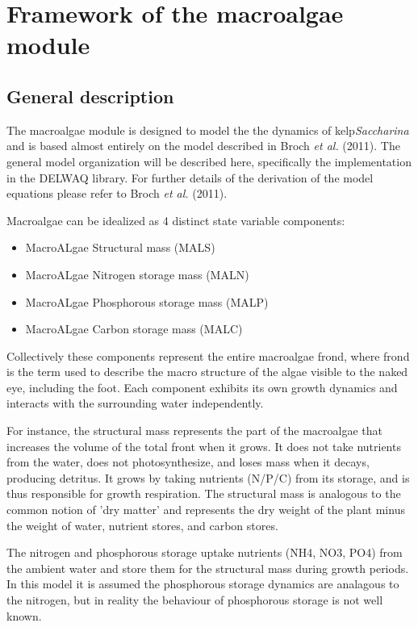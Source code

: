\documentclass{article}
\begin{document}
\section{Framework of the macroalgae module}

\subsection{General description}

The macroalgae module is designed to model the the dynamics of kelp\textit{Saccharina} and is based almost entirely on the model described in Broch \textit{et al.} (2011). The general model organization will be described here, specifically the implementation in the DELWAQ library. For further details of the derivation of the model equations please refer to Broch \textit{et al.} (2011).

Macroalgae can be idealized as 4 distinct state variable components:
\begin{itemize}
\item MacroALgae Structural mass (MALS)
\item MacroALgae Nitrogen storage mass (MALN)
\item MacroALgae Phosphorous storage mass (MALP)
\item MacroALgae Carbon storage mass (MALC)
\end{itemize}
Collectively these components represent the entire macroalgae frond, where frond is the term used to describe the macro structure of the algae visible to the naked eye, including the foot. Each component exhibits its own growth dynamics and interacts with the surrounding water independently. 

For instance, the structural mass represents the part of the macroalgae that increases the volume of the total front when it grows. It does not take nutrients from the water, does not photosynthesize, and loses mass when it decays, producing detritus. It grows by taking nutrients (N/P/C) from its storage, and is thus responsible for growth respiration. The structural mass is analogous to the common notion of 'dry matter' and represents the dry weight of the plant minus the weight of water, nutrient stores, and carbon stores.
 
The nitrogen and phosphorous storage uptake nutrients (NH4, NO3, PO4) from the ambient water and store them for the structural mass during growth periods. In this model it is assumed the phosphorous storage dynamics are analagous to the nitrogen, but in reality the behaviour of phosphorous storage is not well known.
\end{document}
